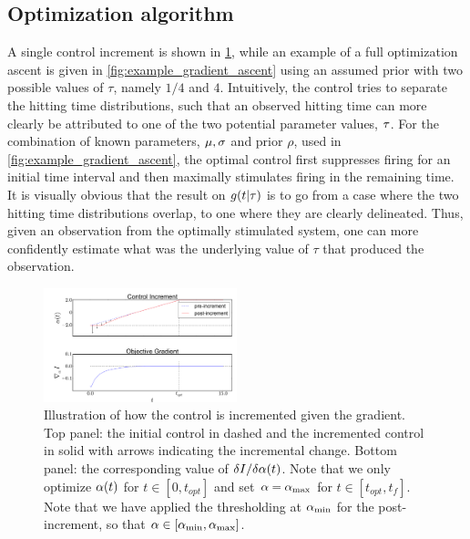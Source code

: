 \documentclass[12pt]{article}
\begin{document}
\subsection{Optimization algorithm}
A single control increment is shown in \cref{fig:example_control_increment},
while an example of a full optimization ascent is given in
\cref{fig:example_gradient_ascent} using an assumed prior with two possible
values of $\tau$, namely $1/4$ and $4$.
 Intuitively, the control tries to separate the hitting time distributions, such
 that an observed hitting time can more clearly be attributed to one of the two
 potential parameter values, ${\tau}$.
For the combination of known parameters, ${\mu }, {\sigma }$ and prior $\rho$, used in
\cref{fig:example_gradient_ascent}, the optimal control first suppresses firing
for an initial time interval and then maximally stimulates firing in the
remaining time. It is visually obvious that the result on $g(t|{ \tau })$ is to go
from a case where the two hitting time distributions overlap, to one where they
are clearly delineated. Thus, given an observation from the optimally stimulated
system, one can more confidently estimate what was the underlying value of
$\tau$ that produced the observation. \begin{figure}[htp]
\begin{center}
  \includegraphics[width=0.5\textwidth]{Figs/FP_Adjoint/control_increment_example.pdf}
  \caption[Single control-increment illustration]{Illustration of how the
  control is incremented given the gradient. Top panel: the
  initial control in dashed and the incremented control in solid with arrows
  indicating the incremental change. Bottom panel: the
  corresponding value of $\delta I/ \delta {\alpha} (t)$.
  Note that we only optimize ${\alpha}(t)$ for $t \in [0, t_{opt}]$ and set ${\alpha}={ {\alpha}_{\textrm{max}} }$
  for $t \in [t_{opt}, t_f]$.  
  Note that we have applied the thresholding at ${ {\alpha}_{\textrm{min}} }$ for the
  post-increment, so that ${\alpha} \in [{ {\alpha}_{\textrm{min}} }, { {\alpha}_{\textrm{max}} }]$.}
  \label{fig:example_control_increment}    
\end{center}
\end{figure}
           
\end{document}
